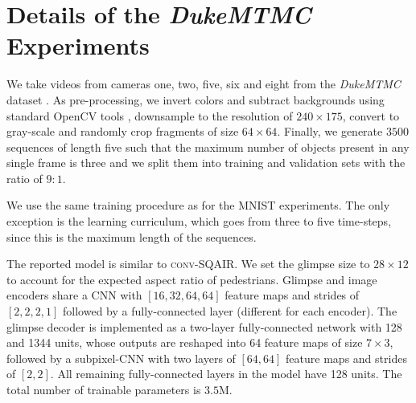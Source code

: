 \section{Details of the \textit{DukeMTMC} Experiments}
\label{app:duke_details}

We take videos from cameras one, two, five, six and eight from the \textit{DukeMTMC} dataset \citep{Ristani2016performance}. As pre-processing, we invert colors and subtract backgrounds using standard OpenCV tools \citep{Itseez2015opencv}, downsample to the resolution of $240 \times 175$, convert to gray-scale and randomly crop fragments of size $64 \times 64$. Finally, we generate $3500$ sequences of length five such that the maximum number of objects present in any single frame is three and we split them into training and validation sets with the ratio of $9:1$.

We use the same training procedure as for the \gls{MNIST} experiments. The only exception is the learning curriculum, which goes from three to five time-steps, since this is the maximum length of the sequences. 

The reported model is similar to \textsc{conv}-\gls{SQAIR}. We set the glimpse size to $28 \times 12$ to account for the expected aspect ratio of pedestrians. Glimpse and image encoders share a \gls{CNN} with $[16,32,64,64]$ feature maps and strides of $[2,2,2,1]$ followed by a fully-connected layer (different for each encoder). The glimpse decoder is implemented as a two-layer fully-connected network with 128 and 1344 units, whose outputs are reshaped into 64 feature maps of size $7 \times 3$, followed by a subpixel-\gls{CNN} with two layers of $[64, 64]$ feature maps and strides of $[2, 2]$. All remaining fully-connected layers in the model have 128 units. The total number of trainable parameters is $3.5$M.